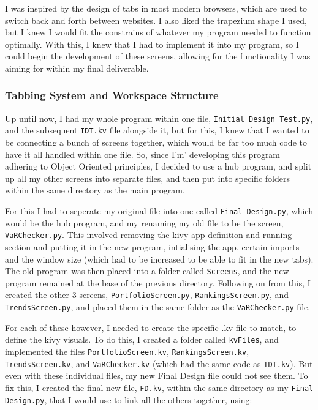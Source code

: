 \documentclass{article}
\begin{document}
I was inspired by the design of tabs in most modern browsers, which are used to switch back and forth between websites. I also liked the trapezium shape I used, but I knew I would fit the constrains of whatever my program needed to function optimally. With this, I knew that I had to implement it into my program, so I could begin the development of these screens, allowing for the functionality I was aiming for within my final deliverable.\\\vspace{0.3cm}

\subsubsection{Tabbing System and Workspace Structure}
Up until now, I had my whole program within one file, \texttt{Initial Design Test.py}, and the subsequent \texttt{IDT.kv} file alongside it, but for this, I knew that I wanted to be connecting a bunch of screens together, which would be far too much code to have it all handled within one file. So, since I'm' developing this program adhering to Object Oriented principles, I decided to use a hub program, and split up all my other screens into separate files, and then put into specific folders within the same directory as the main program.\\\vspace{0.3cm}

For this I had to seperate my original file into one called \texttt{Final Design.py}, which would be the hub program, and my renaming my old file to be the screen, \texttt{VaRChecker.py}. This involved removing the kivy app definition and running section and putting it in the new program, intialising the app, certain imports and the window size (which had to be increased to be able to fit in the new tabs). The old program was then placed into a folder called \texttt{Screens}, and the new program remained at the base of the previous directory. Following on from this, I created the other 3 screens, \texttt{PortfolioScreen.py}, \texttt{RankingsScreen.py}, and \texttt{TrendsScreen.py}, and placed them in the same folder as the \texttt{VaRChecker.py} file.\\\vspace{0.3cm}

For each of these however, I needed to create the specific .kv file to match, to define the kivy visuals. To do this, I created a folder called \texttt{kvFiles}, and implemented the files \texttt{PortfolioScreen.kv}, \texttt{RankingsScreen.kv}, \texttt{TrendsScreen.kv}, and \texttt{VaRChecker.kv} (which had the same code as \texttt{IDT.kv}). But even with these individual files, my new Final Design file could not see them. To fix this, I created the final new file, \texttt{FD.kv}, within the same directory as my \texttt{Final Design.py}, that I would use to link all the others together, using: \\\vspace{0.3cm}
\end{document}
